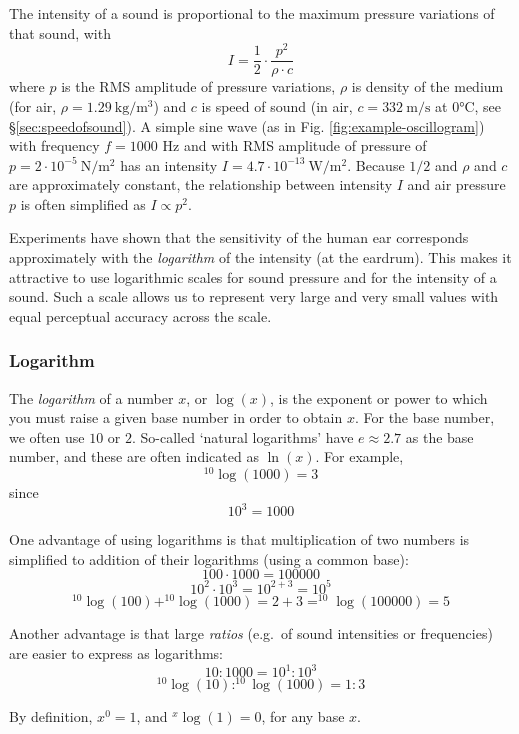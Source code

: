 \documentclass[
]{book}
\begin{document}
The intensity of a sound is proportional to the maximum pressure variations of that sound, with
\[I = \frac{1}{2} \cdot \frac{p^2}{\rho \cdot c}\]
where \(p\) is the RMS amplitude of pressure variations, \(\rho\) is density of the medium (for air, \(\rho = 1.29\ \textrm{kg}/\textrm{m}^3\)) and \(c\) is speed of sound (in air, \(c = 332\ \textrm{m}/\textrm{s}\) at 0°C, see §\ref{sec:speedofsound}). A simple sine wave (as in Fig. \ref{fig:example-oscillogram}) with frequency \(f=1000\) Hz and with RMS amplitude of pressure of \(p=2 \cdot 10^{-5}\ \textrm{N}/\textrm{m}^2\) has an intensity \(I = 4.7 \cdot 10^{-13}\ \textrm{W}/\textrm{m}^2\).
Because \(1/2\) and \(\rho\) and \(c\) are approximately constant, the relationship between intensity \(I\) and air pressure \(p\) is often simplified as \(I \propto p^2\).

Experiments have shown that the sensitivity of the human ear corresponds approximately with the \emph{logarithm} of the intensity (at the eardrum). This makes it attractive to use logarithmic scales for sound pressure and for the intensity of a sound. Such a scale allows us to represent very large and very small values with equal perceptual accuracy across the scale.

\subsubsection{Logarithm}\label{sec:logarithm}

The \emph{logarithm} of a number \(x\), or \(\log(x)\), is the exponent or power to which you must raise a given base number in order to obtain \(x\). For the base number, we often use \(10\) or \(2\). So-called `natural logarithms' have \(e \approx 2.7\) as the base number, and these are often indicated as \(\ln(x)\). For example,
\[^{10}\log(1000)=3\]
since \[10^3=1000\]

One advantage of using logarithms is that multiplication of two numbers is simplified to addition of their logarithms (using a common base):
\[100 \cdot 1000 = 100000\]
\[10^2 \cdot 10^3 = 10^{2+3} = 10^5\]
\[^{10}\log(100) + ^{10}\log(1000) =2+3= ^{10}\log(100000) =5\]

Another advantage is that large \emph{ratios} (e.g.~of sound intensities or frequencies) are easier to express as logarithms:
\[10 : 1000 = 10^1 : 10^3\]
\[^{10}\log(10) : ^{10}\log(1000) = 1 : 3\]

\label{log1}
By definition, \(x^0=1\), and \(^x\log(1)=0\), for any base \(x\).
\end{document}
